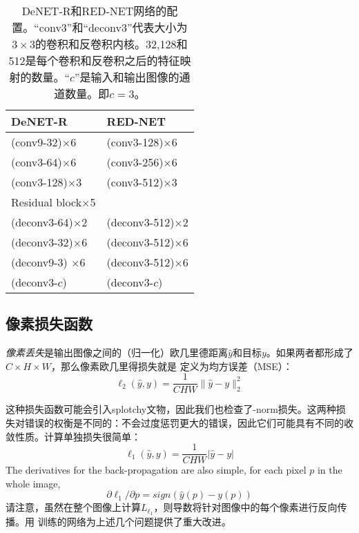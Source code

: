\begin{table}
\vspace{-4mm}
\centering
\caption{DeNET-R和RED-NET网络的配置。“conv3”和“deconv3”代表大小为$ 3 \times3 $的卷积和反卷积内核。32,128和512是每个卷积和反卷积之后的特征映射的数量。“$ c $”是输入和输出图像的通道数量。即$ c = 3 $。}
\begin{tabular}{l | l }\hline
DeNET-R                   &RED-NET                \\ \hline
(conv9-32)$\times$6             &(conv3-128)$\times$6       \\ \hline
(conv3-64)$\times$6             &(conv3-256)$\times$6       \\ \hline
(conv3-128)$\times$3             &(conv3-512)$\times$3       \\ \hline
Residual block$\times$5 &                           \\ \hline
(deconv3-64)$\times$2           &(deconv3-512)$\times$2       \\ \hline
(deconv3-32)$\times$6           &(deconv3-512)$\times$6       \\ \hline
(deconv9-3) $\times$6           &(deconv3-512)$\times$6       \\ \hline
(deconv3-$c$)           &(deconv3-$c$)                \\ \hline
\end{tabular}
\label{table1}
\end{table}
\subsection{像素损失函数}
\emph{像素丢失}是输出图像之间的（归一化）欧几里德距离$ \hat y $和目标$ y $。如果两者都形成了$ C \times H \times W $，那么像素欧几里得损失就是
定义为均方误差（MSE）：
 \begin{equation}
   \ell_2(\hat y, y) = \frac{1}{CHW}\|\hat y - y\|_2^2
  \end{equation}


这种损失函数可能会引入splotchy文物，因此我们也检查了\lone-norm损失。这两种损失对错误的权衡是不同的：\lone 不会过度惩罚更大的错误，因此它们可能具有不同的收敛性质。计算单独损失很简单：
\begin{equation}
\ell_1(\hat y, y) = \frac{1}{CHW}| \hat y - y|
\end{equation}
The derivatives for the back-propagation are also simple,  for each pixel $p$ in the whole image,
\begin{equation}
\partial \ell_1/\partial p  = sign\left(\hat y(p) - y(p)\right)
\end{equation}
请注意，虽然在整个图像上计算$ L_{\ell_1} $，则导数将针对图像中的每个像素进行反向传播。用 训练的网络为上述几个问题提供了重大改进。

